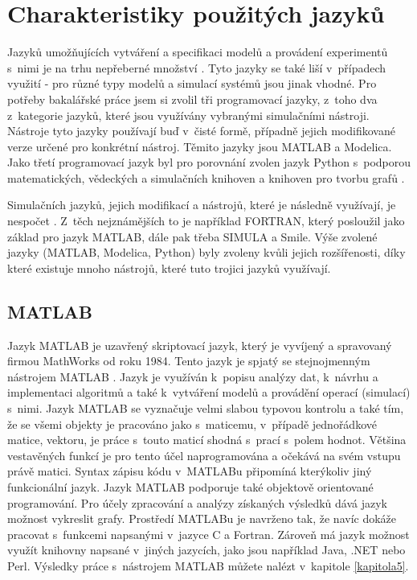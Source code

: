 \section{Charakteristiky použitých jazyků}
\label{popis-jazyky}
Jazyků umožňujících vytváření a specifikaci modelů a provádení experimentů s~nimi je na trhu nepřeberné množství \cite{list-of-process-modelling-lang}. Tyto jazyky se také liší v~případech využití - pro různé typy modelů a simulací systémů jsou jinak vhodné. Pro potřeby bakalářské práce jsem si zvolil tři programovací jazyky, z~toho dva z~kategorie jazyků, které jsou využívány vybranými simulačními nástroji. Nástroje tyto jazyky používají buď v~čisté formě, případně jejich modifikované verze určené pro konkrétní nástroj. Těmito jazyky jsou MATLAB\cite{MATLAB:2010} a Modelica\cite{Fritzson02modelica--}. Jako třetí programovací jazyk byl pro porovnání zvolen jazyk Python s~podporou matematických, vědeckých a simulačních knihoven a knihoven pro tvorbu grafů \cite{scipy}. 

Simulačních jazyků, jejich modifikací a nástrojů, které je následně využívají, je nespočet \cite{list}. Z~těch nejznámějších to je například FORTRAN, který posloužil jako základ pro jazyk MATLAB, dále pak třeba SIMULA a Smile. Výše zvolené jazyky (MATLAB, Modelica, Python) byly zvoleny kvůli jejich rozšířenosti, díky které existuje mnoho nástrojů, které tuto trojici jazyků využívají.

\subsection*{MATLAB}
\label{matlab-lang}
Jazyk MATLAB je uzavřený skriptovací jazyk, který je vyvíjený a spravovaný firmou MathWorks od roku 1984. Tento jazyk je spjatý se stejnojmenným nástrojem MATLAB \cite{MATLAB:2010}. Jazyk je využíván k~popisu analýzy dat, k~návrhu a implementaci algoritmů a také k~vytváření modelů a provádění operací (simulací) s~nimi. Jazyk MATLAB se vyznačuje velmi slabou typovou kontrolu a také tím, že se všemi objekty je pracováno jako s~maticemu, v~případě jednořádkové matice, vektoru, je práce s~touto maticí shodná s~prací s~polem hodnot. Většina vestavěných funkcí je pro tento účel naprogramována a očekává na svém vstupu právě matici. Syntax zápisu kódu v~MATLABu připomíná kterýkoliv jiný funkcionální jazyk. Jazyk MATLAB podporuje také objektově orientované programování. Pro účely zpracování a analýzy získaných výsledků dává jazyk možnost vykreslit grafy. Prostředí MATLABu je navrženo tak, že navíc dokáže pracovat s~funkcemi napsanými v~jazyce C a Fortran. Zároveň má jazyk možnost využít knihovny napsané v~jiných jazycích, jako jsou například Java, .NET nebo Perl. Výsledky práce s~nástrojem MATLAB můžete nalézt v~kapitole \ref{kapitola5}.

